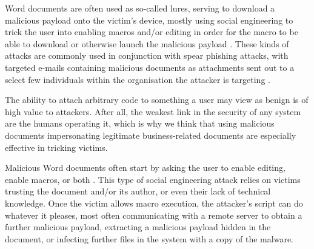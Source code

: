 Word documents are often used as so-called lures, serving to download a malicious payload onto the victim's device,
mostly using social engineering to trick the user into enabling macros and/or editing in order for the macro to be able
to download or otherwise launch the malicious payload \cite{gajek-macros}. These kinds of attacks are commonly used in conjunction with
spear phishing attacks, with targeted e-mails containing malicious documents as attachments sent out to a select few
individuals within the organisation the attacker is targeting \cite{advanced-social-engineering-attacks}.

The ability to attach arbitrary code to something a user may view as benign is of high value to attackers. After all,
the weakest link in the security of any system are the humans operating it, which is why we think that using malicious 
documents impersonating legitimate business-related documents are especially effective in tricking victims.

Malicious Word documents often start by asking the user to enable editing, enable macros, or both \cite{gajek-macros}.
This type of social engineering attack relies on victims trusting the document and/or its author, or even their lack of
technical knowledge. Once the victim allows macro execution, the attacker's script can do whatever it pleases, most
often communicating with a remote server to obtain a further malicious payload, extracting a malicious payload hidden
in the document, or infecting further files in the system with a copy of the malware.

\clearpage

